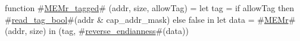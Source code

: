 function #\hyperref[zMEMrzytagged]{MEMr\_tagged}# (addr, size, allowTag) =
{
  let tag  = if allowTag then #\hyperref[zreadzytagzybool]{read\_tag\_bool}#(addr & cap_addr_mask) else false in
  let data = #\hyperref[zMEMr]{MEMr}#(addr, size) in
  (tag, #\hyperref[zreversezyendianness]{reverse\_endianness}#(data))
}
